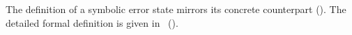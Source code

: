 The definition of a symbolic error state mirrors its concrete counterpart ().
The detailed formal definition is given in~ ().


